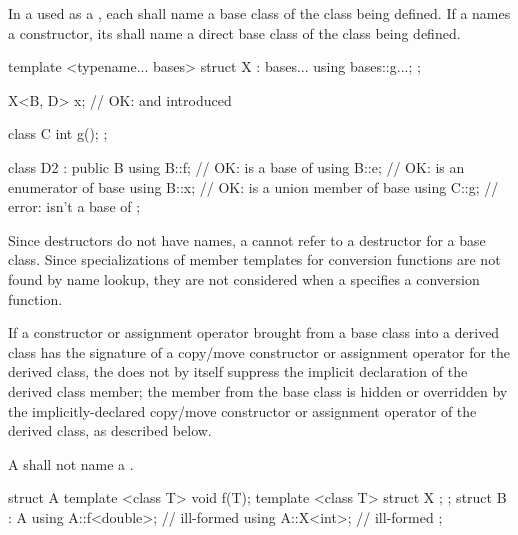 \pnum
In a  used as a
,
each  
shall name a base class of the class being defined. If a
 names a constructor, its
 shall name a direct base class of the class
being defined.
\begin{example}
\begin{codeblock}
template <typename... bases>
struct X : bases... {
  using bases::g...;
};

X<B, D> x;                      // OK:  and  introduced
\end{codeblock}
\end{example}
\begin{example}
\begin{codeblock}
class C {
  int g();
};

class D2 : public B {
  using B::f;                   // OK:  is a base of 
  using B::e;                   // OK:  is an enumerator of base 
  using B::x;                   // OK:  is a union member of base 
  using C::g;                   // error:  isn't a base of 
};
\end{codeblock}
\end{example}

\pnum
\begin{note}
Since destructors do not have names, a
 cannot refer to a
destructor for a base class. Since specializations of member templates
for conversion functions are not found by name lookup, they are not
considered when a  specifies a conversion
function.
\end{note}
If a constructor or assignment operator brought from a base class into a derived class
has the signature of a copy/move constructor or assignment operator
for the derived class,
the  does not by itself
suppress the implicit declaration of the derived class member;
the member from the base class is hidden or overridden
by the implicitly-declared copy/move constructor or assignment operator
of the derived class, as described below.

\pnum
A  shall not name a .
\begin{example}

\begin{codeblock}
struct A {
  template <class T> void f(T);
  template <class T> struct X { };
};
struct B : A {
  using A::f<double>;           // ill-formed
  using A::X<int>;              // ill-formed
};
\end{codeblock}
\end{example}

